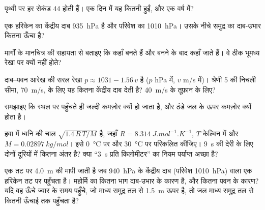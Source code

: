 \begin{exercise}[$\star\star$]\label{exo:g10:storms-and-cyclones:7}
पृथ्वी पर हर सेकंड 44  होती हैं। एक दिन में यह कितनी हुईं, और एक
वर्ष में?
\end{exercise}

\begin{exercise}[$\star\star$]\label{exo:g10:storms-and-cyclones:8}
एक हरिकेन का केंद्रीय दाब \qty{935}{hPa} है और परिवेश का
\qty{1010}{hPa}। उसके नीचे समुद्र का दाब-उभार कितना ऊँचा है?
\end{exercise}

\begin{exercise}[$\star\star$]\label{exo:g10:storms-and-cyclones:9}
मार्गों के मानचित्र की सहायता से बताइए कि  कहाँ बनते हैं और बनने के बाद
कहाँ जाते हैं। वे ठीक भूमध्य रेखा पर क्यों नहीं होते?
\end{exercise}

\begin{exercise}[$\star\star$]\label{exo:g10:storms-and-cyclones:10}
दाब--पवन आरेख की सरल रेखा $p \approx 1031 - 1.56\,v$ है
($p$ \unit{hPa} में, $v$ \unit{m/s} में)। श्रेणी 5 की निचली सीमा, \qty{70}{m/s}, के लिए
यह कितना केंद्रीय दाब देती है? \qty{40}{m/s} के
तूफ़ान के लिए?
\end{exercise}

\begin{exercise}[$\star\star$]\label{exo:g10:storms-and-cyclones:11}
समझाइए कि  स्थल पर पहुँचते ही जल्दी कमज़ोर क्यों हो जाता है, और
ठंडे जल के ऊपर कमज़ोर क्यों होता है।
\end{exercise}

\begin{exercise}[$\star\star\star$]\label{exo:g10:storms-and-cyclones:12}
हवा में ध्वनि की चाल $\sqrt{1.4\,R\,T/M}$ है, जहाँ $R =
\qty{8.314}{J.mol^{-1}.K^{-1}}$, $T$ केल्विन में और $M =
\qty{0.02897}{kg/mol}$। इसे \qty{0}{\degreeCelsius} पर और
\qty{30}{\degreeCelsius} पर परिकलित कीजिए। \qty{9}{s} की देरी के लिए दोनों
दूरियों में कितना अंतर है? क्या ``\qty{3}{s} प्रति किलोमीटर'' का नियम पर्याप्त अच्छा है?
\end{exercise}

\begin{exercise}[$\star\star\star$]\label{exo:g10:storms-and-cyclones:13}
एक तट पर \qty{4.0}{m} की  मापी जाती है जब \qty{940}{hPa} के
केंद्रीय दाब (परिवेश \qty{1010}{hPa}) वाला एक हरिकेन तट पर
पहुँचता है। महोर्मि का कितना भाग दाब-उभार के कारण है, और कितना
पवन के कारण? यदि वह ऊँचे ज्वार के समय पहुँचे, जो माध्य समुद्र तल से \qty{1.5}{m} ऊपर है, तो
जल माध्य समुद्र तल से कितनी ऊँचाई तक पहुँचता है?
\end{exercise}

